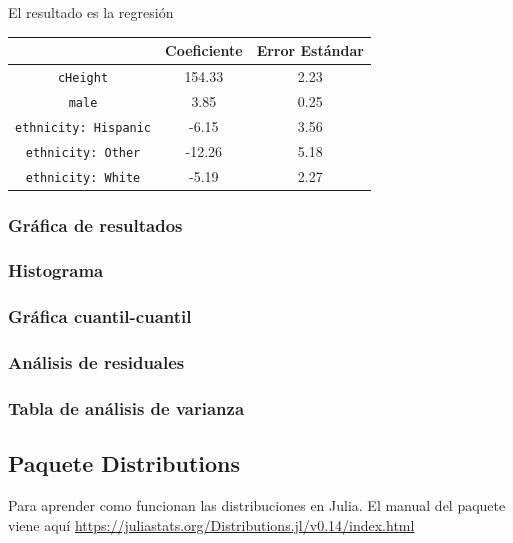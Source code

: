 El resultado es la regresión 


\begin{tabular}{|c|c|c|}
    \hline 
    \rule[-1ex]{0pt}{2.5ex}  & Coeficiente & Error Estándar \\ 
    \hline 
    \rule[-1ex]{0pt}{2.5ex} \texttt{cHeight} & 154.33 & 2.23 \\
    \hline 
    \rule[-1ex]{0pt}{2.5ex} \texttt{male} & 3.85 & 0.25 \\ 
    \hline 
    \rule[-1ex]{0pt}{2.5ex} \texttt{ethnicity: Hispanic} & -6.15 & 3.56 \\ 
    \hline 
    \rule[-1ex]{0pt}{2.5ex} \texttt{ethnicity: Other} & -12.26 & 5.18 \\ 
    \hline 
    \rule[-1ex]{0pt}{2.5ex} \texttt{ethnicity: White} & -5.19 & 2.27 \\ 
    \hline
\end{tabular}





\subsubsection{Gráfica de resultados}

\subsubsection{Histograma}

\subsubsection{Gráfica cuantil-cuantil}

\subsubsection{Análisis de residuales}

\subsubsection{Tabla de análisis de varianza}


\subsection{Paquete Distributions}
Para aprender como funcionan las distribuciones en Julia. El manual del paquete viene aquí \url{https://juliastats.org/Distributions.jl/v0.14/index.html}




